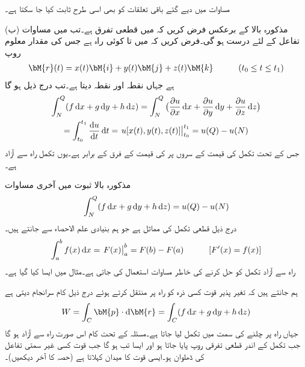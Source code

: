 مساوات  میں دیے گئے باقی تعلقات کو بھی اسی طرح ثابت کیا جا سکتا ہے۔

(ب) مذکورہ بالا کے برعکس فرض کریں کہ  میں  قطعی تفرق ہے۔تب   میں مساوات   تفاعل  کے لئے درست ہو گی۔فرض کریں کہ  میں  تا  کوئی راہ  ہے جس کی مقدار معلوم روپ
\begin{align*}
\bM{r}(t)=x(t)\bM{i}+y(t)\bM{j}+z(t)\bM{k}\quad \quad \quad (t_0\le t\le t_1)
\end{align*}
ہے جہاں  نقطہ  اور  نقطہ  دیتا ہے۔تب درج ذیل ہو گا
\begin{multline*}
\int_N^Q (f\dif x+g\dif y+h\dif z)=\int_N^Q \big(\frac{\partial u}{\partial x}\dif x+\frac{\partial u}{\partial y}\dif y+\frac{\partial u}{\partial z}\dif z\big)\\
=\int_{t_0}^{t_1}\frac{\dif u}{\dif t}\dif t=\left. u[x(t),y(t),z(t)]\right|_{t_0}^{t_1}=u(Q)-u(N)
\end{multline*} 
جس کے تحت تکمل کی قیمت  کے سروں پر  کی قیمت کے فرق کے برابر ہے۔یوں تکمل راہ سے آزاد ہے۔

مذکورہ بالا ثبوت میں آخری مساوات
\begin{align}\label{مساوات_خطی_تکمل_راہ_سے_آزاد_تکمل}
\int_N^Q (f\dif x+g\dif y+h\dif z)=u(Q)-u(N)
\end{align}
درج ذیل قطعی تکمل کی مماثل ہے جو ہم بنیادی علم الاحصاء سے جانتے ہیں۔
\begin{align*}
\int_a^b f(x)\dif x=\left. F(x)\right |_a^b=F(b)-F(a)\quad \quad \quad [F'(x)=f(x)]
\end{align*}
راہ سے آزاد تکمل کو حل کرنے کی خاطر مساوات  استعمال کی جاتی ہے۔مثال  میں ایسا کیا گیا ہے۔

ہم جانتے ہیں کہ تغیر پذیر قوت  کسی ذرہ کو راہ  پر منتقل کرتے ہوئے درج ذیل کام  سرانجام دیتی  ہے
\begin{align*}
W=\int_C \bM{p}\cdot \dif \bM{r}=\int_C (f\dif x+g\dif y+h\dif z)
\end{align*}
جہاں راہ پر چلنے کی سمت میں تکمل لیا جاتا ہے۔مسئلہ  کے تحت  کام اس صورت راہ سے آزاد ہو گا جب تکمل کے اندر قطعی تفرقی روپ پایا جاتا ہو اور ایسا تب ہو گا جب قوت  کسی غیر سمتی تفاعل  کی ڈھلوان ہو۔ایسی قوت کا میدان   کہلاتا ہے (حصہ  کا آخر دیکھیں)۔

